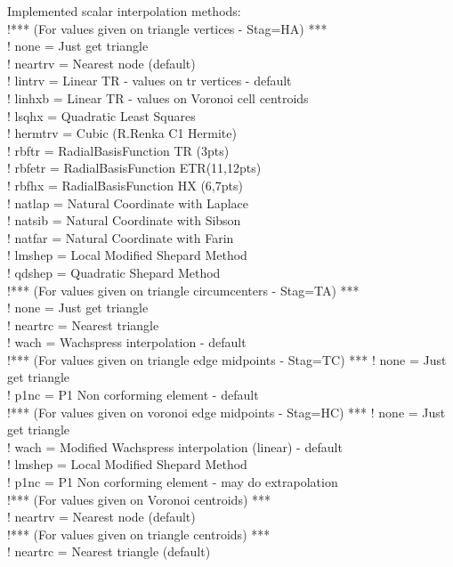 \documentclass[a4paper,10pt]{article}
\begin{document}
Implemented scalar interpolation methods:\\
    !*** (For values given on triangle vertices - Stag=HA) ***\\
    ! none     = Just get triangle\\
    ! neartrv  = Nearest node  (default)\\
    ! lintrv   = Linear TR - values on tr vertices - default\\
    ! linhxb   = Linear TR - values on Voronoi cell centroids\\
    ! lsqhx    = Quadratic Least Squares \\
    ! hermtrv  = Cubic (R.Renka C1 Hermite)\\
    ! rbftr    = RadialBasisFunction TR (3pts)\\
    ! rbfetr   = RadialBasisFunction ETR(11,12pts)\\
    ! rbfhx    = RadialBasisFunction HX (6,7pts)\\
    ! natlap   = Natural Coordinate with Laplace\\
    ! natsib   = Natural Coordinate with Sibson\\
    ! natfar   = Natural Coordinate with Farin\\
    ! lmshep   = Local Modified Shepard Method\\
    ! qdshep   = Quadratic Shepard Method\\
    !*** (For values given on triangle circumcenters - Stag=TA) ***\\
    ! none     = Just get triangle\\
    ! neartrc  = Nearest triangle\\
    ! wach     = Wachspress interpolation - default\\
    !*** (For values given on triangle edge midpoints - Stag=TC) ***
    ! none     = Just get triangle\\
    ! p1nc     = P1 Non corforming element - default\\
    !*** (For values given on voronoi edge midpoints - Stag=HC) ***
    ! none     = Just get triangle \\
    ! wach     = Modified Wachspress interpolation (linear) - default \\
    ! lmshep   = Local Modified Shepard Method\\
    ! p1nc     = P1 Non corforming element - may do extrapolation\\
    !*** (For values given on Voronoi centroids) ***\\
    ! neartrv  = Nearest node  (default)\\
    !*** (For values given on triangle centroids) ***\\
    ! neartrc  = Nearest triangle  (default)\\
\end{document}
